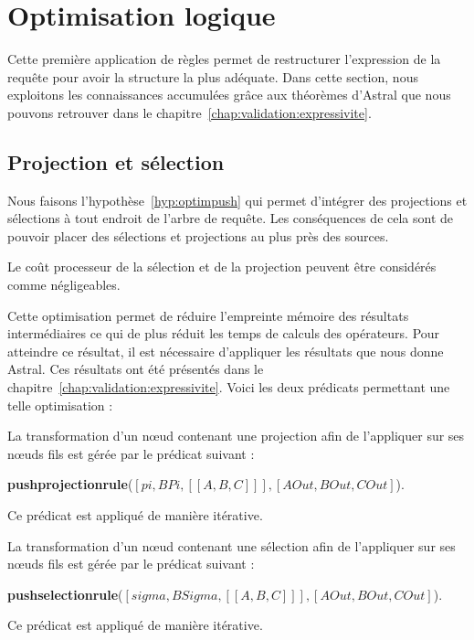 \section{Optimisation logique}\label{sec:contrib:astronef:logique}
Cette première application de règles permet de restructurer l'expression de la requête pour avoir la structure la plus adéquate. Dans cette section, nous exploitons les connaissances accumulées grâce aux théorèmes d'Astral que nous pouvons retrouver dans le chapitre~\ref{chap:validation:expressivite}.

\subsection{Projection et sélection}
Nous faisons l'hypothèse~\ref{hyp:optimpush} qui permet d'intégrer des projections et sélections à tout endroit de l'arbre de requête. Les conséquences de cela sont de pouvoir placer des sélections et projections au plus près des sources. 
\begin{hyp}\label{hyp:optimpush}
    Le coût processeur de la sélection et de la projection peuvent être considérés comme négligeables.
\end{hyp}
Cette optimisation permet de réduire l'empreinte mémoire des résultats intermédiaires ce qui de plus réduit les temps de calculs des opérateurs. Pour atteindre ce résultat, il est nécessaire d'appliquer les résultats que nous donne Astral. Ces résultats ont été présentés dans le chapitre~\ref{chap:validation:expressivite}. Voici les deux prédicats permettant une telle optimisation :
\begin{regle}
La transformation d'un nœud contenant une projection afin de l'appliquer sur ses nœuds fils est gérée par le prédicat suivant :
\begin{center} \textbf{pushprojectionrule}($[pi,BPi,[[A,B,C]]],[AOut,BOut,COut]$).\end{center}
Ce prédicat est appliqué de manière itérative.
\end{regle}
\begin{regle}
La transformation d'un nœud contenant une sélection afin de l'appliquer sur ses nœuds fils est gérée par le prédicat suivant :
\begin{center} \textbf{pushselectionrule}($[sigma,BSigma,[[A,B,C]]],[AOut,BOut,COut]$).\end{center}
Ce prédicat est appliqué de manière itérative.
\end{regle}

